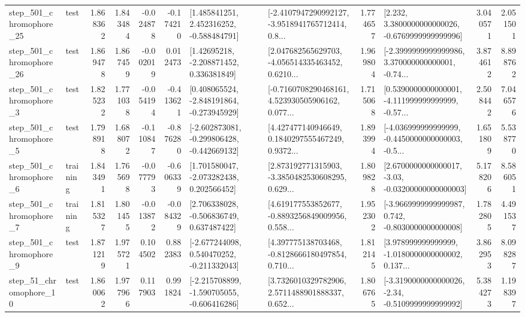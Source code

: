 \begin{tabular}{llrrrrllrlrr}
  step\_501\_chromophore\_25 &      test &      1.868362 &    1.843484 &     -0.024878 & -0.174210 &    [1.485841251, 2.452316252, -0.588484791] &  [-2.4107947290992127, -3.9518941765712414, 0.8... &       1.774657 &   [2.232, 3.3800000000000026, -0.6769999999999996] &            3.040571 &          2.051501 \\
  step\_501\_chromophore\_26 &      test &      1.869478 &    1.867459 &     -0.002019 &  0.012473 &     [1.42695218, -2.208871452, 0.336381849] &  [2.047682565629703, -4.056514335463452, 0.6210... &       1.969804 &  [-2.3999999999999986, 3.370000000000001, -0.74... &            3.874612 &          8.898762 \\
   step\_501\_chromophore\_3 &      test &      1.825232 &    1.771038 &     -0.054194 & -0.413621 &   [0.408065524, -2.848191864, -0.273945929] &  [-0.7160708290468161, 4.523930505906162, 0.077... &       1.715068 &  [0.5390000000000001, -4.111999999999999, -0.57... &            2.508442 &          7.046576 \\
   step\_501\_chromophore\_5 &      test &      1.798918 &    1.688072 &     -0.110847 & -0.876280 &  [-2.602873081, -0.299806428, -0.442669132] &  [4.427477140946649, 0.1840297555467249, 0.9372... &       1.893994 &  [-4.036999999999999, -0.4450000000000003, -0.5... &            1.651809 &          5.538770 \\
   step\_501\_chromophore\_6 &  training &      1.843491 &    1.765698 &     -0.077793 & -0.606339 &    [1.701580047, -2.073282438, 0.202566452] &  [2.873192771315903, -3.3850482530608295, 0.629... &       1.809828 &  [2.6700000000000017, -3.03, -0.03200000000000003] &            5.178206 &          8.586051 \\
   step\_501\_chromophore\_7 &  training &      1.815327 &    1.801455 &     -0.013872 & -0.084329 &    [2.706338028, -0.506836749, 0.637487422] &  [4.619177553852677, -0.8893256849009956, 0.558... &       1.952302 &  [-3.9669999999999987, 0.742, -0.8030000000000008] &            1.782805 &          4.491537 \\
   step\_501\_chromophore\_9 &      test &      1.871219 &    1.975721 &      0.104502 &  0.882383 &   [-2.677244098, 0.540470252, -0.211332043] &  [4.397775138703468, -0.8128666180497854, 0.710... &       1.812145 &  [3.978999999999999, -1.0180000000000002, 0.137... &            3.862953 &          8.098287 \\
   step\_51\_chromophore\_10 &      test &      1.860062 &    1.977966 &      0.117903 &  0.991824 &  [-2.215708899, -1.590705055, -0.606416286] &  [3.7326010329782906, 2.5711488901888337, 0.652... &       1.806765 &  [-3.3190000000000026, -2.34, -0.5109999999999992] &            5.384273 &          1.198397 \\

\end{tabular}
